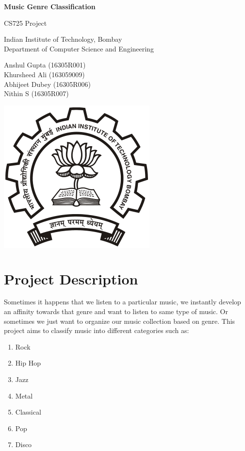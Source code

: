\documentclass[a4paper,10pt]{article}
\begin{document}
\begin{titlepage}
\begin{center}
\vspace*{1cm}

\huge{\textbf{Music Genre Classification}}

\vspace{0.5cm}
CS725 Project

\vspace{3.5cm}
Indian Institute of Technology, Bombay\\
Department of Computer Science and Engineering
\vspace{3.5cm}

\Large{Anshul Gupta (16305R001) \\ Khursheed Ali (163059009) \\ Abhijeet Dubey (16305R006) \\ Nithin S (16305R007)}

\vfill

\vspace{0.8cm}

\includegraphics[scale=0.35]{IITB.png}
\end{center}
\end{titlepage}
 
\section{Project Description}
Sometimes it happens that we listen to a particular music, we instantly develop an affinity towards that genre and want to listen to same type of music. Or sometimes we just want to organize our music collection based on genre.
This project aims to classify music into different categories such as:
\begin{enumerate}
 \item Rock
 \item Hip Hop
 \item Jazz
 \item Metal
 \item Classical
 \item Pop
 \item Disco
\end{enumerate}
\end{document}
